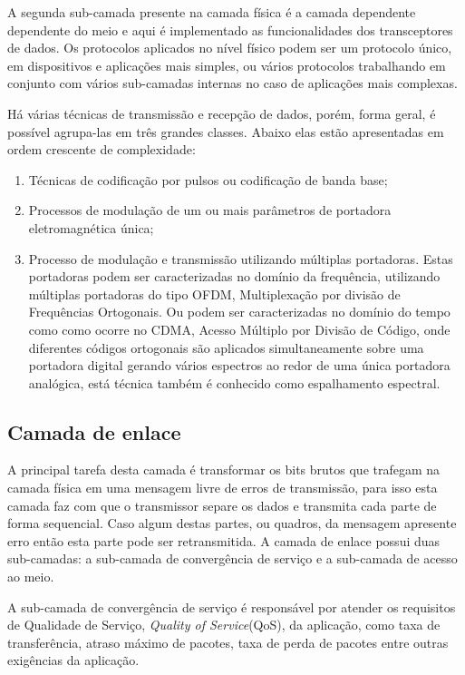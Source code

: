 A segunda sub-camada presente na camada física é a camada dependente dependente do meio e aqui é implementado as funcionalidades dos transceptores de dados. Os protocolos aplicados no nível físico podem ser um protocolo único, em dispositivos e aplicações mais simples, ou vários protocolos trabalhando em conjunto com vários sub-camadas internas no caso de aplicações mais complexas.

Há várias técnicas de transmissão e recepção de dados, porém, forma geral, é possível agrupa-las em três grandes classes. Abaixo elas estão apresentadas em ordem crescente de complexidade:
\begin{enumerate}
      \item Técnicas de codificação por pulsos ou codificação de banda base;
      \item Processos de modulação de um ou mais parâmetros de portadora eletromagnética única;
      \item Processo de modulação e transmissão utilizando múltiplas portadoras. Estas portadoras podem ser caracterizadas no domínio da frequência, utilizando múltiplas portadoras do tipo OFDM, Multiplexação por divisão de Frequências Ortogonais. Ou podem ser caracterizadas no domínio do tempo como como ocorre no CDMA, Acesso Múltiplo por Divisão de Código, onde diferentes códigos ortogonais são aplicados simultaneamente sobre uma portadora digital gerando vários espectros ao redor de uma única portadora analógica, está técnica também é conhecido como espalhamento espectral.
\end{enumerate}

\subsection{Camada de enlace}
A principal tarefa desta camada é transformar os bits brutos que trafegam na camada física em uma mensagem livre de erros de transmissão, para isso esta camada faz com que o transmissor separe os dados e transmita cada parte de forma sequencial. Caso algum destas partes, ou quadros, da mensagem apresente erro então esta parte pode ser retransmitida. A camada de enlace possui duas sub-camadas: a sub-camada de convergência de serviço e a sub-camada de acesso ao meio.

A sub-camada de convergência de serviço é responsável por atender os requisitos de Qualidade de Serviço, \emph{Quality of Service}(QoS), da aplicação, como taxa de transferência, atraso máximo de pacotes, taxa de perda de pacotes entre outras exigências da aplicação.

